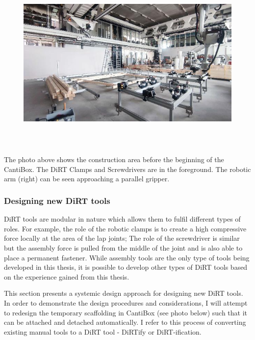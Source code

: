 \documentclass[11pt]{book}
\begin{document}
\begin{figure}[H]
\includegraphics[width=15.92cm,height=8.96cm]{./images/image1.jpeg}
\end{figure}


The photo above shows the construction area before the beginning of the CantiBox. The DiRT Clamps and Screwdrivers are in the foreground. The robotic arm (right) can be seen approaching a parallel gripper. 

\subsubsection{Designing new DiRT tools}

DiRT tools are modular in nature which allows them to fulfil different types of roles. For example, the role of the robotic clamps is to create a high compressive force locally at the area of the lap joints; The role of the screwdriver is similar but the assembly force is pulled from the middle of the joint and is also able to place a permanent fastener. While assembly tools are the only type of tools being developed in this thesis, it is possible to develop other types of DiRT tools based on the experience gained from this thesis. 

This section presents a systemic design approach for designing new DiRT tools. In order to demonstrate the design procedures and considerations, I will attempt to redesign the temporary scaffolding in CantiBox (see photo below) such that it can be attached and detached automatically. I refer to this process of converting existing manual tools to a DiRT tool - DiRTify or DiRT-ification.
\end{document}
